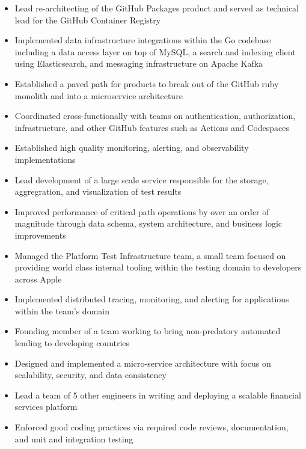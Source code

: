 \documentclass[11pt,letterpaper,sans]{moderncv}        %
\begin{document}
\vspace*{-4pt}
\begin{itemize}
\item Lead re-architecting of the GitHub Packages product and served as technical lead for the GitHub Container Registry
\item Implemented data infrastructure integrations within the Go codebase including a data access layer on top of MySQL, a search and indexing client using Elasticsearch, and messaging infrastructure on Apache Kafka
\item Established a paved path for products to break out of the GitHub ruby monolith and into a microservice architecture
\item Coordinated cross-functionally with teams on authentication, authorization, infrastructure, and other GitHub features such as Actions and Codespaces
\item Established high quality monitoring, alerting, and observability implementations
\end{itemize}
\vspace*{4pt}

\vspace*{-4pt}
\begin{itemize}
\item Lead development of a large scale service responsible for the storage, aggregration, and visualization of test results
\item Improved performance of critical path operations by over an order of magnitude through data schema, system architecture, and business logic improvements
\item Managed the Platform Test Infrastructure team, a small team focused on providing world class internal tooling within the testing domain to developers across Apple
\item Implemented distributed tracing, monitoring, and alerting for applications within the team's domain
\end{itemize}
\vspace*{4pt}

\vspace*{-4pt}
\begin{itemize}
\item Founding member of a team working to bring non-predatory automated lending to developing countries
\item Designed and implemented a micro-service architecture with focus on scalability, security, and data consistency
\item Lead a team of 5 other engineers in writing and deploying a scalable financial services platform
\item Enforced good coding practices via required code reviews, documentation, and unit and integration testing
\end{itemize}
\vspace*{4pt}
\end{document}
